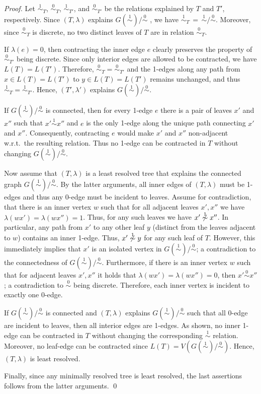 \documentclass[smallextended]{svjour3}
\newcommand{\rev}[1]{\begingroup\color{blue}#1\endgroup}
\newcommand{\Ro}{\mathrel{\overset{0}{\sim}}}
\newcommand{\Rl}{\mathrel{\overset{1}{\sim}}}
\begin{document}
\begin{proof}
  Let $\Rl_T$, $\Ro_T$, $\Rl_{T'}$, and $\Ro_{T'}$ be the relations
  explained by $T$ and $T'$, respectively.  Since $(T,\lambda)$ explains
  $G(\Rl)/\Ro$ , we have $\Rl_T\,=\,\Rl/\Ro$. Moreover, since $\Ro_T$ is
  discrete, no two distinct leaves of $T$ are in relation $\Ro_T$.

  If $\lambda(e)=0$, then contracting the inner edge $e$ clearly preserves the property of
  $\Ro_{T'}$ being discrete.  Since only interior edges are allowed to be
  contracted, we have $L(T)=L(T')$. Therefore, $\Ro_T =\Ro_{T'}$ and the
  1-edges along any path from $x\in L(T)=L(T')$ to $y\in L(T)=L(T')$
  remains unchanged, and thus $\Rl_T=\Rl_{T'}$.  Hence, $(T',\lambda')$
  explains $G(\Rl)/\Ro$.

  If $G(\Rl)/\Ro$ is connected, then for every 1-edge $e$ there is a pair
  of leaves $x'$ and $x''$ such that $x'\Rl x''$ and $e$ is the only 1-edge
  along the unique path connecting $x'$ and $x''$. Consequently,
  contracting $e$ would make $x'$ and $x''$ non-adjacent w.r.t.\ the
  resulting relation.  Thus no 1-edge can be contracted in $T$ without
  changing $G(\Rl)/\Ro$. 

\rev{
	Now assume that $(T,\lambda)$ is a least resolved 
	tree that explains the connected graph $G(\Rl)/\Ro$. 
	By the latter arguments, all inner edges of $(T,\lambda)$ 
	must be 1-edges and thus any 0-edge must be incident to leaves. 
	Assume for contradiction, that there 
	is an inner vertex $w$ such that for all adjacent leaves $x',x''$
	we have $\lambda(wx') = \lambda(wx'') = 1$. Thus, for any
	such leaves we have $x'\not\Rl x''$. In particular, any 
	path from $x'$ to any other leaf $y$ (distinct from the 
	leaves adjacent to $w$) contains an inner
	1-edge. Thus, $x'\not \Rl y$ for any such leaf of $T$. 
	However, this immediately implies that $x'$ is an isolated
	vertex in $G(\Rl)/\Ro$; a contradiction to the connectedness of  $G(\Rl)/\Ro$.
	Furthermore, if there is an inner vertex $w$ such that for adjacent leaves $x',x''$
	it holds that $\lambda(wx') = \lambda(wx'') = 0$, then $x'\Ro x''$;
	a contradiction to $\Ro$ being discrete. 
	Therefore, each inner vertex 	is incident to exactly one 0-edge.
	
	If $G(\Rl)/\Ro$ is connected and $(T,\lambda)$ explains $G(\Rl)/\Ro$
	such that all 0-edge are incident to leaves, then all interior edges
	are 1-edges. As shown, no inner 1-edge can be contracted in $T$ without changing
   the corresponding $\Rl$ relation. Moreover, no leaf-edge can be contracted 
	since $L(T) = V(G(\Rl)/\Ro)$. Hence, $(T,\lambda)$ is least resolved.

	Finally, since any minimally resolved tree is least resolved, 
	the last assertions follows from the latter arguments. 	}
 \qed
\end{proof}
\end{document}
